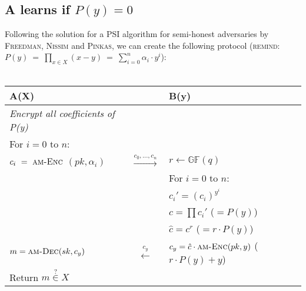\documentclass{report}
\begin{document}
		\subsection{A learns if $P(y) = 0$}
		\startsubsection
			Following the solution for a PSI algorithm for semi-honest adversaries by \textsc{Freedman, Nissim} and \textsc{Pinkas}, we can create the following protocol (\textsc{remind:} $P(y) \ = \ \prod_{x \in X} (x-y) \ = \ \sum_{i=0}^n \alpha _i \cdot y^i$): \\\\
			\begin{tabular}{lcl}
				\hline
				\textbf{A(X)} && \textbf{B(y)} \\
				\hline
				\textit{Encrypt all coefficients of P(y)} && \\
				For $i=0$ to $n$: && \\
				\indent $c_i \ = \ \textsc{am-Enc}$ $(pk, \alpha _i)$ & $\stackrel{c_0,...,c_n}{\longrightarrow}$ & $r \leftarrow \mathbb{GF}(q)$ \\
				&& For $i=0$ to $n$: \\
				&& \indent $c_i' = (c_i)^{y^i}$ \\
				&& $c = \prod c_i'$ \indent ($= P(y)$) \\
				&& $\hat{c} = c^r$ \indent ($= r \cdot P(y)$) \\
				$m = \textsc{am-Dec}(sk,c_y)$ & $\stackrel{c_y}{\longleftarrow}$ & $c_y = \hat{c} \cdot \textsc{am-Enc}(pk,y)$ \indent ($r \cdot P(y) + y$) \\
				Return $m \stackrel{?}{\in} X$ \\
				\hline
			\end{tabular}
		\closesection
		\newpage
\end{document}
